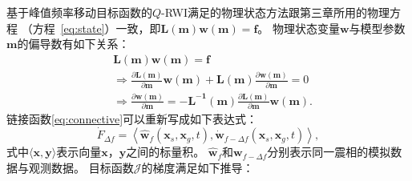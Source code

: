 基于峰值频率移动目标函数的$Q$-RWI满足的物理状态方法跟第三章所用的物理方程
（方程~\ref{eq:state}）一致，即$\mathbf{L(m)}\mathbf{w(m)}=\mathbf{f}$。
物理状态变量$\mathbf{w}$与模型参数$\mathbf{m}$的偏导数有如下关系：
\begin{equation}
	\begin{aligned}
		&\mathbf{L(m)}\mathbf{w(m)}=\mathbf{f} \\
		&\Rightarrow \frac{\partial \mathbf{L(m)}}{\partial\mathbf{m}}\mathbf{w(m)}+
		\mathbf{L(m)}\frac{\partial\mathbf{w(m)}}{\partial\mathbf{m}}=0 \\
		&\Rightarrow \frac{\partial\mathbf{w(m)}}{\partial\mathbf{m}}=
		-\mathbf{L^{-1}(m)}\frac{\partial \mathbf{L(m)}}{\partial\mathbf{m}}\mathbf{w(m)}.
	\end{aligned}
	\label{eq:ad_state}
\end{equation}
链接函数\ref{eq:connective}可以重新写成如下表达式：
\begin{equation}
	\dot{F}_{\Delta f}=\left\langle \hat{\mathbf{w}}_f(\mathbf{x}_s,\mathbf{x}_g,t),
	\dot{\mathbf{w}}_{f-\Delta f}(\mathbf{x}_s,\mathbf{x}_g,t) \right\rangle,
\end{equation}
式中$\langle \mathbf{x},\mathbf{y}\rangle$表示向量$\mathbf{x}$，$\mathbf{y}$之间的标量积。
$\hat{\mathbf{w}}_f$和$\mathbf{w}_{f-\Delta f}$分别表示同一震相的模拟数据与观测数据。
目标函数$\mathcal{J}$的梯度满足如下推导：
